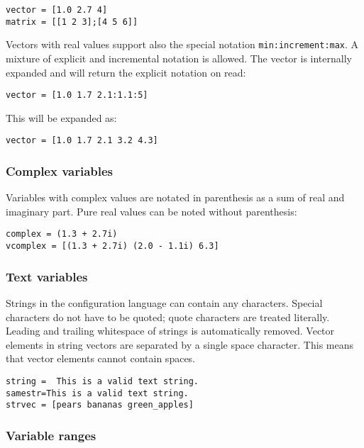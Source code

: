 \begin{verbatim}
vector = [1.0 2.7 4]
matrix = [[1 2 3];[4 5 6]]
\end{verbatim}

Vectors with real values support also the special notation
\verb!min:increment:max!. A mixture of explicit and incremental
notation is allowed. The vector is internally expanded and will return
the explicit notation on read:

\begin{verbatim}
vector = [1.0 1.7 2.1:1.1:5]
\end{verbatim}

This will be expanded as:

\begin{verbatim}
vector = [1.0 1.7 2.1 3.2 4.3]
\end{verbatim}

\subsubsection{Complex variables}%
%
%

Variables with complex values are notated in parenthesis as a sum of
real and imaginary part. Pure real values can be noted without
parenthesis:

\begin{verbatim}
complex = (1.3 + 2.7i)
vcomplex = [(1.3 + 2.7i) (2.0 - 1.1i) 6.3]
\end{verbatim}

\subsubsection{Text variables}

Strings in the \mha{} configuration language can contain any characters. Special
characters do not have to be quoted; quote characters are treated
literally. Leading and trailing whitespace of strings is automatically
removed. Vector elements in string vectors are separated by a single
space character. This means that vector elements cannot contain spaces.

\begin{verbatim}
string =  This is a valid text string.
samestr=This is a valid text string.
strvec = [pears bananas green_apples]
\end{verbatim}

\subsubsection{Variable ranges}

